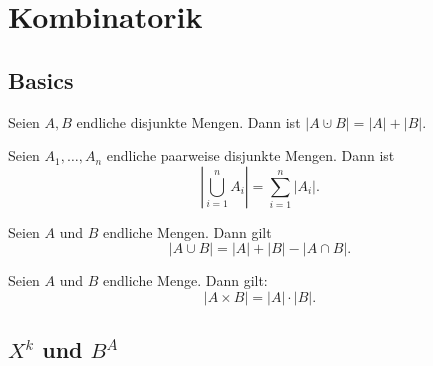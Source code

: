 \chapter{Kombinatorik} 

\section{Basics} 

\begin{lem}
	Seien $A, B$ endliche disjunkte Mengen. Dann ist $|A \cupdot B| = |A| + |B|$. 
\end{lem} 

\begin{lem} \label{lem:disjunkte:vereinigung}
	Seien $A_1,\ldots,A_n$ endliche paarweise disjunkte Mengen. Dann ist 
	\[
		\left| \bigcup_{i=1}^n A_i \right| = \sum_{i=1}^n |A_i|. 
	\]
\end{lem} 

\begin{lem}
	Seien $A$ und $B$ endliche Mengen. Dann gilt 
	\[
		|A \cup B| = |A| + |B| - |A \cap B|. 
	\]
\end{lem}

\begin{lem}
	Seien $A$ und $B$ endliche Menge. Dann gilt: 
	\[
		|A \times B| = |A| \cdot |B|. 
	\]
\end{lem}
 

\section{$X^k$ und $B^A$} 



